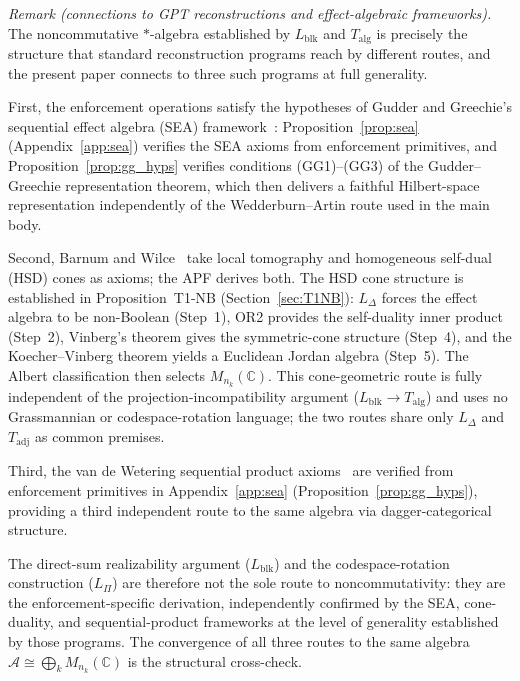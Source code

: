\documentclass[11pt]{article}
\theoremstyle{remark}
\begin{document}
\smallskip\noindent\textit{Remark (connections to GPT reconstructions and effect-algebraic frameworks).}
The noncommutative $*$-algebra established by $L_{\mathrm{blk}}$ and $T_{\mathrm{alg}}$ is precisely the structure that standard reconstruction programs reach by different routes, and the present paper connects to three such programs at full generality.

First, the enforcement operations satisfy the hypotheses of Gudder and Greechie's sequential effect algebra (SEA) framework~\cite{GudderGreechie2002}: Proposition~\ref{prop:sea} (Appendix~\ref{app:sea}) verifies the SEA axioms from enforcement primitives, and Proposition~\ref{prop:gg_hyps} verifies conditions (GG1)--(GG3) of the Gudder--Greechie representation theorem, which then delivers a faithful Hilbert-space representation independently of the Wedderburn--Artin route used in the main body.

Second, Barnum and Wilce~\cite{BarnumWilce2012} take local tomography and homogeneous self-dual (HSD) cones as axioms; the APF derives both.  The HSD cone structure is established in Proposition~T1-NB (Section~\ref{sec:T1NB}): $L_\Delta$ forces the effect algebra to be non-Boolean (Step~1), OR2 provides the self-duality inner product (Step~2), Vinberg's theorem gives the symmetric-cone structure (Step~4), and the Koecher--Vinberg theorem yields a Euclidean Jordan algebra (Step~5).  The Albert classification then selects $M_{n_k}(\mathbb{C})$.  This cone-geometric route is fully independent of the projection-incompatibility argument ($L_{\mathrm{blk}} \to T_{\mathrm{alg}}$) and uses no Grassmannian or codespace-rotation language; the two routes share only $L_\Delta$ and $T_{\mathrm{adj}}$ as common premises.

Third, the van de Wetering sequential product axioms~\cite{vandeWetering2019} are verified from enforcement primitives in Appendix~\ref{app:sea} (Proposition~\ref{prop:gg_hyps}), providing a third independent route to the same algebra via dagger-categorical structure.

The direct-sum realizability argument ($L_{\mathrm{blk}}$) and the codespace-rotation construction ($L_\Pi$) are therefore not the sole route to noncommutativity: they are the enforcement-specific derivation, independently confirmed by the SEA, cone-duality, and sequential-product frameworks at the level of generality established by those programs.  The convergence of all three routes to the same algebra $\mathcal{A} \cong \bigoplus_k M_{n_k}(\mathbb{C})$ is the structural cross-check.
\end{document}
